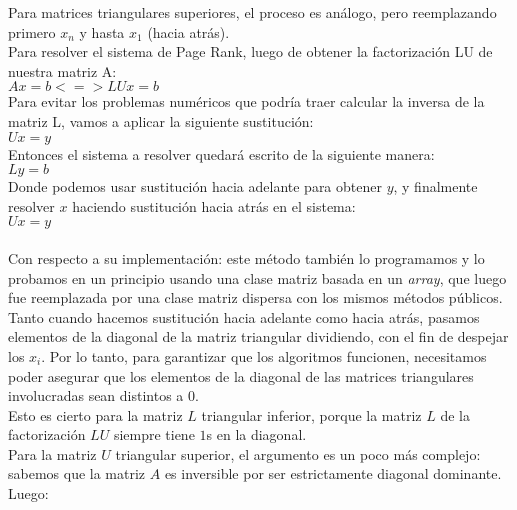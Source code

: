 			Para matrices triangulares superiores, el proceso es análogo, pero reemplazando primero $x_n$ y hasta $x_1$ (hacia atrás). \\

			Para resolver el sistema de Page Rank, luego de obtener la factorización LU de nuestra matriz A: \\

			$Ax = b <=> LUx = b$ \\

			Para evitar los problemas numéricos que podría traer calcular la inversa de la matriz L, vamos a aplicar la siguiente sustitución: \\

			$Ux = y$ \\

			Entonces el sistema a resolver quedará escrito de la siguiente manera: \\

			$Ly = b$ \\

			Donde podemos usar sustitución hacia adelante para obtener $y$, y finalmente resolver $x$ haciendo sustitución hacia atrás en el sistema: \\

			$Ux = y$ \\

			\quad \\

				Con respecto a su implementación: este método también lo programamos y lo probamos en un principio usando una clase matriz basada en un \textit{array}, que luego fue reemplazada por una clase matriz dispersa con los mismos métodos públicos. \\

				Tanto cuando hacemos sustitución hacia adelante como hacia atrás, pasamos elementos de la diagonal de la matriz triangular dividiendo, con el fin de despejar los $x_i$. Por lo tanto, para garantizar que los algoritmos funcionen, necesitamos poder asegurar que los elementos de la diagonal de las matrices triangulares involucradas sean distintos a $0$. \\

				Esto es cierto para la matriz $L$ triangular inferior, porque la matriz $L$ de la factorización $LU$ siempre tiene $1$s en la diagonal. \\

				Para la matriz $U$ triangular superior, el argumento es un poco más complejo: sabemos que la matriz $A$ es inversible por ser estrictamente diagonal dominante. Luego: \\ %

